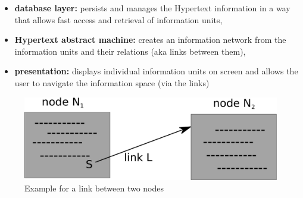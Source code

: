 \begin{itemize}
  \item \textbf{database layer:} persists and manages the Hypertext information in a way that allows fast access and retrieval of information units,
  \item \textbf{Hypertext abstract machine:} creates an information network from the information units and their relations (aka links between them),
  \item \textbf{presentation:} displays individual information units on screen and allows the user to navigate the information space (via the links)
\end{itemize}

\begin{figure}[H]
 \centering
 \includegraphics[width=0.9\columnwidth]{images/Hypertext.pdf}
 \caption[Example for a link between two nodes]{Example for a link between two nodes \citep[pg. 303]{borghoff2000computer}}
\label{fig:images_cscw_hypertext_concept}
\end{figure}



